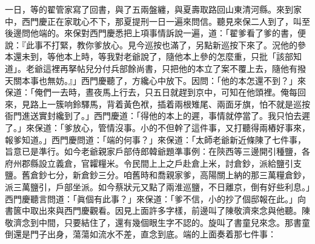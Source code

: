 一日，等的翟管家寫了回書，與了五兩盤纏，與夏壽取路回山東清河縣。來到家中，西門慶正在家耽心不下，那夏提刑一日一遍來問信。聽見來保二人到了，叫至後邊問他端的。來保對西門慶悉把上項事情訴說一遍，道：「翟爹看了爹的書，便說：『此事不打緊，教你爹放心。見今巡按也滿了，另點新巡按下來了。況他的參本還未到，等他本上時，等我對老爺說了，隨他本上參的怎麼重，只批「該部知道」。老爺這裡再拏帖兒分付兵部餘尚書，只把他的本立了案不覆上去，隨他有撥天關本事也無妨。』」西門慶聽了，方纔心中放下。因問：「他的本怎還不到？」來保道：「俺們一去時，晝夜馬上行去，只五日就趕到京中，可知在他頭裡。俺每回來，見路上一簇响鈴驛馬，背着黃色袱，插着兩根雉尾、兩面牙旗，怕不就是巡按衙門進送實封纔到了。」西門慶道：「得他的本上的遲，事情就停當了。我只怕去遲了。」來保道：「爹放心，管情沒事。小的不但幹了這件事，又打聽得兩樁好事來，報爹知道。」西門慶問道：「端的何事？」來保道：「太師老爺新近條陳了七件事，旨意已是準行。如今老爺親家戶部侍郎韓爺題準事例：在陝西等三邊開引種鹽，各府州郡縣設立義倉，官糶糧米。令民間上上之戶赴倉上米，討倉鈔，派給鹽引支鹽。舊倉鈔七分，新倉鈔三分。咱舊時和喬親家爹，高陽關上納的那三萬糧倉鈔，派三萬鹽引，戶部坐派。如今蔡狀元又點了兩淮巡鹽，不日離京，倒有好些利息。」{}西門慶聽言問道：「眞個有此事？」來保道：「爹不信，小的抄了個邸報在此。」向書篋中取出來與西門慶觀看。因見上面許多字樣，前邊叫了陳敬濟來念與他聽。陳敬濟念到中間，只要結住了，還有幾個眼生字不認的。旋叫了書童兒來念。那書童倒還是門子出身，蕩蕩如流水不差，直念到底。端的上面奏着那七件事：

